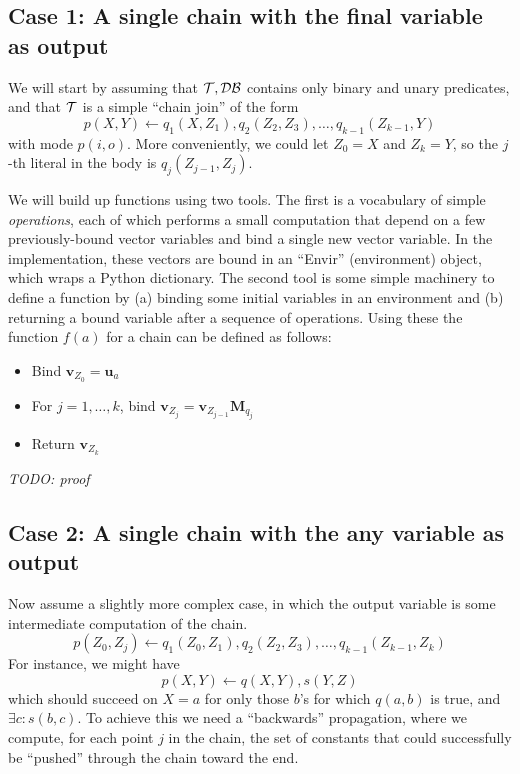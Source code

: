 \documentclass[12pt]{article}
\newcommand{\yy}[1]{\textit{TODO: {#1}}}
\newcommand{\trm}[1]{\textit{#1}}
\newcommand{\vek}[1]{\textbf{#1}}
\newcommand{\M}{\textbf{M}}
\begin{document}
\subsection{Case 1: A single chain with the final variable as output}

We will start by assuming that ${\cal T,DB}$ contains only binary and
unary predicates, and that ${\cal T}$ is a simple ``chain join'' of
the form
\[ p(X,Y) \leftarrow q_1(X,Z_1),q_2(Z_2,Z_3),\ldots,q_{k-1}(Z_{k-1},Y)
\]
with mode $p(i,o)$.  More conveniently, we could let $Z_0=X$ and
$Z_k=Y$, so the $j$-th literal in the body is $q_j(Z_{j-1},Z_j)$.

We will build up functions using two tools.  The first is a vocabulary
of simple \trm{operations}, each of which performs a small computation
that depend on a few previously-bound vector variables and bind a
single new vector variable. In the implementation, these vectors are
bound in an ``Envir'' (environment) object, which wraps a Python
dictionary.  The second tool is some simple machinery to define a
function by (a) binding some initial variables in an environment and
(b) returning a bound variable after a sequence of operations.  Using
these the function $f(a)$ for a chain can be defined as follows:

\begin{itemize}
\item Bind $\vek{v}_{Z_0} = \vek{u}_a$
\item For $j=1,\ldots,k$, bind $\vek{v}_{Z_j} = \vek{v}_{Z_{j-1}} \M_{q_j}$
\item Return $\vek{v}_{Z_{k}}$
\end{itemize}

\yy{proof}

\subsection{Case 2: A single chain with the any variable as output}

Now assume a slightly more complex case, in which the output variable
is some intermediate computation of the chain.
\[ p(Z_0,Z_j) \leftarrow q_1(Z_0,Z_1),q_2(Z_2,Z_3),\ldots,q_{k-1}(Z_{k-1},Z_k)
\]
For instance, we might have
\[ p(X,Y) \leftarrow q(X,Y),s(Y,Z)
\]
which should succeed on $X=a$ for only those $b$'s for which $q(a,b)$
is true, and $\exists c: s(b,c)$.  To achieve this we need a
``backwards'' propagation, where we compute, for each point $j$ in the
chain, the set of constants that could successfully be ``pushed''
through the chain toward the end.  
\end{document}

